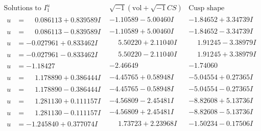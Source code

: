 \documentclass[1p]{elsarticle_modified}
\theoremstyle{definition}
\newcommand{\I}{\sqrt{-1}}
\begin{document}
$$\begin{array}{c|c|c}  
\text{Solutions to }I^u_{1}& \I (\text{vol} + \sqrt{-1}CS) & \text{Cusp shape}\\
 \hline 
\begin{aligned}
u &= \phantom{-}0.086113 + 0.839589 I\end{aligned}
 & -1.10589 - 5.00460 I & -1.84652 + 3.34739 I \\ \hline\begin{aligned}
u &= \phantom{-}0.086113 - 0.839589 I\end{aligned}
 & -1.10589 + 5.00460 I & -1.84652 - 3.34739 I \\ \hline\begin{aligned}
u &= -0.027961 + 0.833462 I\end{aligned}
 & \phantom{-}5.50220 + 2.11040 I & \phantom{-}1.91245 - 3.38979 I \\ \hline\begin{aligned}
u &= -0.027961 - 0.833462 I\end{aligned}
 & \phantom{-}5.50220 - 2.11040 I & \phantom{-}1.91245 + 3.38979 I \\ \hline\begin{aligned}
u &= -1.18427\phantom{ +0.000000I}\end{aligned}
 & -2.46649\phantom{ +0.000000I} & -1.74060\phantom{ +0.000000I} \\ \hline\begin{aligned}
u &= \phantom{-}1.178890 + 0.386444 I\end{aligned}
 & -4.45765 + 0.58948 I & -5.04554 + 0.27365 I \\ \hline\begin{aligned}
u &= \phantom{-}1.178890 - 0.386444 I\end{aligned}
 & -4.45765 - 0.58948 I & -5.04554 - 0.27365 I \\ \hline\begin{aligned}
u &= \phantom{-}1.281130 + 0.111157 I\end{aligned}
 & -4.56809 - 2.45481 I & -8.82608 + 5.13736 I \\ \hline\begin{aligned}
u &= \phantom{-}1.281130 - 0.111157 I\end{aligned}
 & -4.56809 + 2.45481 I & -8.82608 - 5.13736 I \\ \hline\begin{aligned}
u &= -1.245840 + 0.377074 I\end{aligned}
 & \phantom{-}1.73723 + 2.23968 I & -1.50234 - 0.17506 I \\ \hline\begin{aligned}

\end{aligned}
\end{array}$$
\end{document}
